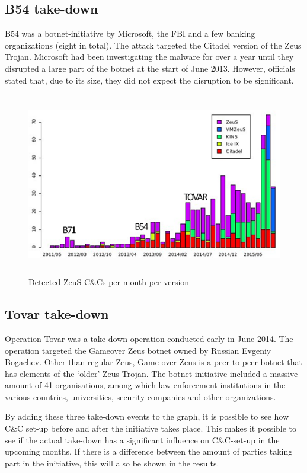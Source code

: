 \documentclass{sig-alternate-br}
\begin{document}
\subsection{B54 take-down}
B54 was a botnet-initiative by Microsoft, the FBI and a few banking organizations (eight in total). The attack targeted the Citadel version of the Zeus Trojan. Microsoft had been investigating the malware for over a year until they disrupted a large part of the botnet at the start of June 2013. However, officials stated that, due to its size, they did not expect the disruption to be significant.
\begin{figure}[]
	\centering
    \includegraphics[height=8cm]{zeusversions1.png}
    \caption{Detected ZeuS C\&Cs per month per version}
    \label{fig:zeusversions}
\end{figure}

\subsection{Tovar take-down}
Operation Tovar was a take-down operation conducted early in June 2014. The operation targeted the Gameover Zeus\cite{Michael2015239} botnet owned by Russian Evgeniy Bogachev. Other than regular Zeus, Game-over Zeus is a peer-to-peer botnet that has elements of the `older' Zeus Trojan. The botnet-initiative included a massive amount of 41 organisations, among which law enforcement institutions in the various countries, universities, security companies and other organizations. \FloatBarrier

By adding these three take-down events to the graph, it is possible to see how C\&C set-up before and after the initiative takes place. This makes it possible to see if the actual take-down has a significant influence on C\&C-set-up in the upcoming months. If there is a difference between the amount of parties taking part in the initiative, this will also be shown in the results.
\end{document}
